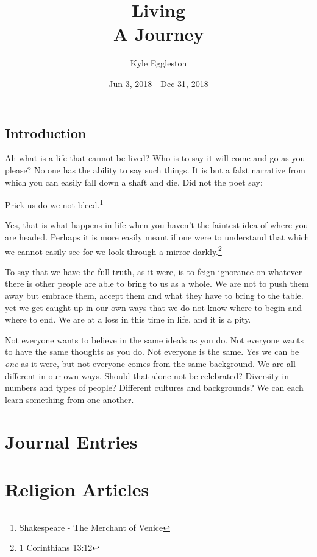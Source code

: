 \documentclass{book}
\title{%
  Living \\
  \large A Journey}
\author{Kyle Eggleston}
\date{Jun 3, 2018 - Dec 31, 2018}
\begin{document}
\maketitle
\thispagestyle{empty}

\frontmatter

\section*{Introduction}

Ah what is a life that cannot be lived? Who is to say it will come and go as you
please? No one has the ability to say such things. It is but a falst narrative
from which you can easily fall down a shaft and die. Did not the poet say:

\begin{displayquote}
Prick us do we not bleed.\footnote{Shakespeare - The Merchant of Venice}
\end{displayquote}

Yes, that is what happens in life when you haven't the faintest idea of where
you are headed. Perhaps it is more easily meant if one were to understand that
which we cannot easily see for we look through a mirror 
darkly.\footnote{1 Corinthians 13:12}

To say that we have the full truth, as it were, is to feign ignorance on 
whatever there is other people are able to bring to us as a whole. We are not to 
push them away but embrace them, accept them and what they have to bring to the
table. yet we get caught up in our own ways that we do not know where to begin
and where to end. We are at a loss in this time in life, and it is a pity.

Not everyone wants to believe in the same ideals as you do. Not everyone wants
to have the same thoughts as you do. Not everyone is the same. Yes we can be 
\textit{one} as it were, but not everyone comes from the same background. We 
are all different in our own ways. Should that alone not be celebrated?
Diversity in numbers and types of people? Different cultures and backgrounds? We
can each learn something from one another.

\mainmatter

\chapter{Journal Entries}







\chapter{Religion Articles}










\appendix




\backmatter
\printbibliography
\end{document}
